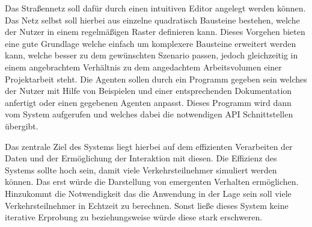 

Das Straßennetz soll dafür durch einen intuitiven Editor angelegt werden können.
Das Netz selbst soll hierbei aus einzelne quadratisch Bausteine bestehen, welche der Nutzer in einem regelmäßigen Raster definieren kann.
Dieses Vorgehen bieten eine gute Grundlage welche einfach um komplexere Bausteine erweitert werden kann, welche besser zu dem gewünschten Szenario passen, jedoch gleichzeitig in einem angebrachtem Verhältnis zu dem angedachtem Arbeitsvolumen einer Projektarbeit steht.
Die Agenten sollen durch ein Programm gegeben sein welches der Nutzer mit Hilfe von Beispielen und einer entsprechenden Dokumentation anfertigt oder einen gegebenen Agenten anpasst.
Dieses Programm wird dann vom System aufgerufen und welches dabei die notwendigen API Schnittstellen übergibt.

Das zentrale Ziel des Systems liegt hierbei auf dem effizienten Verarbeiten der Daten und der Ermöglichung der Interaktion mit diesen.
Die Effizienz des Systems sollte hoch sein, damit viele Verkehrsteilnehmer simuliert werden können.
Das erst würde die Darstellung von emergenten Verhalten ermöglichen.
Hinzukommt die Notwendigkeit das die Anwendung in der Lage sein soll viele Verkehrsteilnehmer in Echtzeit zu berechnen.
Sonst ließe dieses System keine iterative Erprobung zu beziehungsweise würde diese stark erschweren.

